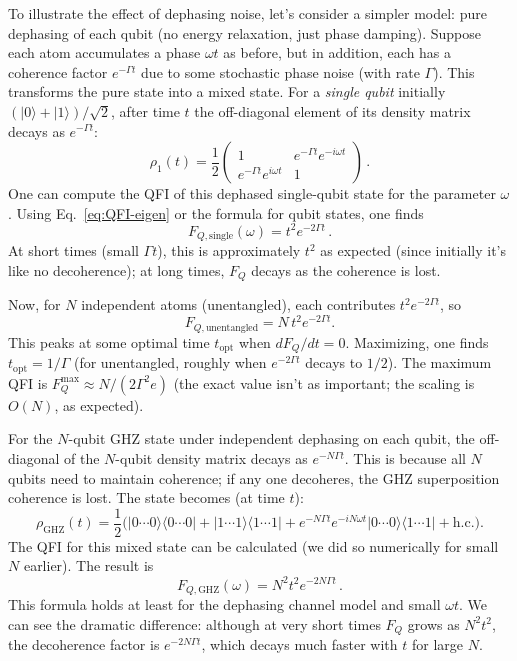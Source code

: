 To illustrate the effect of dephasing noise, let’s consider a simpler model: pure dephasing of each qubit (no energy relaxation, just phase damping). Suppose each atom accumulates a phase $\omega t$ as before, but in addition, each has a coherence factor $e^{-\Gamma t}$ due to some stochastic phase noise (with rate $\Gamma$). This transforms the pure state into a mixed state. For a \emph{single qubit} initially $(|0\rangle+|1\rangle)/\sqrt{2}$, after time $t$ the off-diagonal element of its density matrix decays as $e^{-\Gamma t}$:
\[
\rho_1(t) = \frac{1}{2}\begin{pmatrix}1 & e^{-\Gamma t} e^{-i \omega t} \\ e^{-\Gamma t} e^{i \omega t} & 1\end{pmatrix} \,.
\]
One can compute the QFI of this dephased single-qubit state for the parameter $\omega$. Using Eq.~\eqref{eq:QFI-eigen} or the formula for qubit states, one finds
\[
F_{Q, \text{single}}(\omega) = t^2 e^{-2\Gamma t} \,.
\]
At short times (small $\Gamma t$), this is approximately $t^2$ as expected (since initially it’s like no decoherence); at long times, $F_Q$ decays as the coherence is lost.



Now, for $N$ independent atoms (unentangled), each contributes $t^2 e^{-2\Gamma t}$, so
\[
F_{Q,\text{unentangled}} = N\, t^2 e^{-2\Gamma t}.
\]
This peaks at some optimal time $t_{\text{opt}}$ when $dF_Q/dt = 0$. Maximizing, one finds $t_{\text{opt}} = 1/\Gamma$ (for unentangled, roughly when $e^{-2\Gamma t}$ decays to $1/2$). The maximum QFI is $F_Q^{\max} \approx N/(2\Gamma^2 e)$ (the exact value isn’t as important; the scaling is $O(N)$, as expected).



For the $N$-qubit GHZ state under independent dephasing on each qubit,
the off-diagonal of the $N$-qubit density matrix decays as $e^{-N
  \Gamma t}$. This is because all $N$ qubits need to maintain
coherence; if any one decoheres, the GHZ superposition coherence is
lost. The state becomes (at time $t$):
\[
\rho_{\text{GHZ}}(t) = \frac{1}{2}\Big(|0\cdots0\rangle\langle 0\cdots0| + |1\cdots1\rangle\langle 1\cdots1| + e^{-N\Gamma t} e^{-i N \omega t}|0\cdots0\rangle\langle 1\cdots1| + \text{h.c.}\Big) .
\]
The QFI for this mixed state can be calculated (we did so numerically for small $N$ earlier). The result is
\[
F_{Q,\text{GHZ}}(\omega) = N^2 t^2 e^{-2 N \Gamma t} \,.
\]
This formula holds at least for the dephasing channel model and small $\omega t$. We can see the dramatic difference: although at very short times $F_Q$ grows as $N^2 t^2$, the decoherence factor is $e^{-2 N \Gamma t}$, which decays much faster with $t$ for large $N$.



